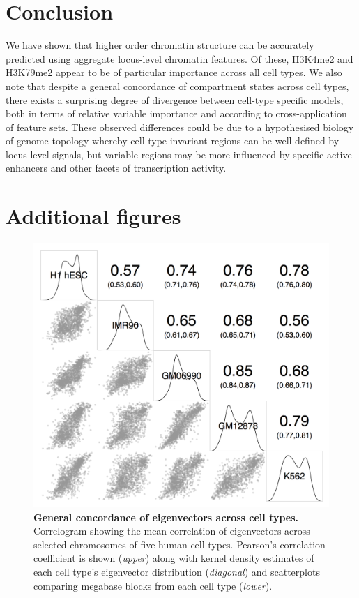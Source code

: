 \documentclass[a4paper]{report}
\begin{document}
\begingroup
\let\clearpage\relax
\chapter{Conclusion} 

We have shown that higher order chromatin structure can be accurately
predicted using aggregate locus-level chromatin features. Of these, H3K4me2 and
H3K79me2 appear to be of particular importance across all cell types. We also note that despite a
general concordance of compartment states across cell types, there
exists a surprising degree of divergence between cell-type specific models, both in terms of relative
variable importance and according to cross-application of feature
sets. These observed differences could be due to a hypothesised
biology of genome topology whereby cell type invariant regions can be
well-defined by locus-level signals, but variable regions may be more
influenced by specific active enhancers and other facets of
transcription activity.
\endgroup

\newpage


\chapter{Additional figures}

\begin{figure}[H]
\vspace{-36pt}
\begin{center}
\includegraphics[width=.55\textwidth]{figs/corrgram.png}
\captionsetup{width=\textwidth}
\caption{ {\bf General concordance of eigenvectors across cell types.}
  Correlogram showing the mean correlation of eigenvectors across
  selected chromosomes of five human cell types. Pearson's correlation
  coefficient is shown (\emph{upper}) along with kernel density
  estimates of each cell type's eigenvector distribution
  (\emph{diagonal}) and scatterplots comparing megabase blocks from
  each cell type (\emph{lower}).
} \label{fig:corrgram}
\end{center} 
\vspace{-24pt}
\end{figure} 
\end{document}
